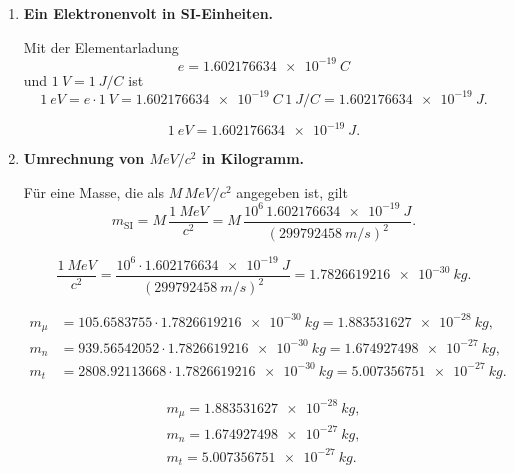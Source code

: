 \documentclass[11pt,a4paper]{scrartcl}
\theoremstyle{definition}
\theoremstyle{plain}
\theoremstyle{remark}
\begin{document}
\begin{enumerate}[label=(\alph*)]
    \item \textbf{Ein Elektronenvolt in SI-Einheiten.}

    \begin{calculationbox}
    Mit der Elementarladung
    \[
        e = \SI{1.602176634e-19}{C}
    \]
    und $\SI{1}{V}=\SI{1}{J/C}$ ist
    \[
        \SI{1}{eV}
        = e\cdot \SI{1}{V}
        = \SI{1.602176634e-19}{C}\,\SI{1}{J/C}
        = \SI{1.602176634e-19}{J}.
    \]
    \end{calculationbox}

    \begin{answerbox}
    \[
        \boxed{\SI{1}{eV}=\SI{1.602176634e-19}{J}}.
    \]
    \end{answerbox}

    \item \textbf{Umrechnung von $\si{MeV}/c^2$ in Kilogramm.}

    \begin{formulabox}
    Für eine Masse, die als $M\,\si{MeV}/c^2$ angegeben ist, gilt
    \[
        m_{\mathrm{SI} }
        = M\,\frac{\SI{1}{MeV}}{c^2}
        = M\,\frac{10^6\,\SI{1.602176634e-19}{J}}{(\SI{299792458}{m/s})^2}.
    \]
    \end{formulabox}

    \begin{sidecalcbox}[title=Umrechnungsfaktor]
    \[
        \frac{\SI{1}{MeV}}{c^2}
        = \frac{10^6\cdot \SI{1.602176634e-19}{J}}{(\SI{299792458}{m/s})^2}
        = \SI{1.7826619216e-30}{kg}.
    \]
    \end{sidecalcbox}

    \begin{calculationbox}
    \begin{align*}
        m_\mu
        &= 105.6583755\cdot\SI{1.7826619216e-30}{kg}
         = \SI{1.883531627e-28}{kg},\\
        m_n
        &= 939.56542052\cdot\SI{1.7826619216e-30}{kg}
         = \SI{1.674927498e-27}{kg},\\
        m_t
        &= 2808.92113668\cdot\SI{1.7826619216e-30}{kg}
         = \SI{5.007356751e-27}{kg}.
    \end{align*}
    \end{calculationbox}

    \begin{answerbox}
    \begin{align*}
        \boxed{m_\mu = \SI{1.883531627e-28}{kg}},\\
        \boxed{m_n = \SI{1.674927498e-27}{kg}},\\
        \boxed{m_t = \SI{5.007356751e-27}{kg}}.
    \end{align*}
    \end{answerbox}
\end{enumerate}
\end{document}
